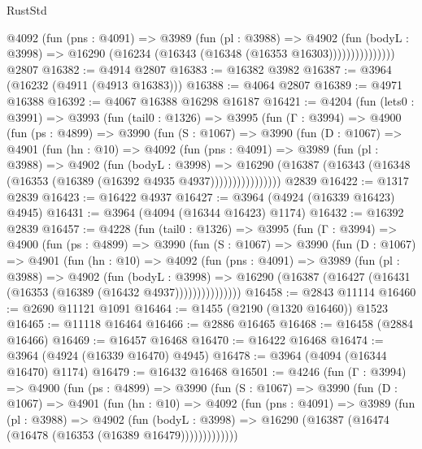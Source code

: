 \begin{lexlean}{RustStd}
\begin{coremodule}
{\begin{coremodule}
{{{{{{{{{{{{{{{{{{{{{{{{{{{{{{{{{{{{{{                  @4092
                    (fun (pns : @4091) =>
                    @3989
                      (fun (pl : @3988) =>
                      @4902
                        (fun (bodyL : @3998) =>
                        @16290 (@16234 (@16343 (@16348 (@16353 @16303)))))))))))))))
    @2807
@16382 := @4914 @2807
@16383 := @16382 @3982
@16387 := @3964 (@16232 (@4911 (@4913 @16383)))
@16388 := @4064 @2807
@16389 := @4971 @16388
@16392 := @4067 @16388 @16298 @16187
@16421 := @4204
    (fun (lets0 : @3991) =>
    @3993
      (fun (tail0 : @1326) =>
      @3995
        (fun (Γ : @3994) =>
        @4900
          (fun (ps : @4899) =>
          @3990
            (fun (S : @1067) =>
            @3990
              (fun (D : @1067) =>
              @4901
                (fun (hn : @10) =>
                @4092
                  (fun (pns : @4091) =>
                  @3989
                    (fun (pl : @3988) =>
                    @4902
                      (fun (bodyL : @3998) =>
                      @16290
                        (@16387 (@16343 (@16348 (@16353 (@16389 (@16392 @4935 @4937))))))))))))))))
    @2839
@16422 := @1317 @2839
@16423 := @16422 @4937
@16427 := @3964 (@4924 (@16339 @16423) @4945)
@16431 := @3964 (@4094 (@16344 @16423) @1174)
@16432 := @16392 @2839
@16457 := @4228
    (fun (tail0 : @1326) =>
    @3995
      (fun (Γ : @3994) =>
      @4900
        (fun (ps : @4899) =>
        @3990
          (fun (S : @1067) =>
          @3990
            (fun (D : @1067) =>
            @4901
              (fun (hn : @10) =>
              @4092
                (fun (pns : @4091) =>
                @3989
                  (fun (pl : @3988) =>
                  @4902
                    (fun (bodyL : @3998) =>
                    @16290 (@16387 (@16427 (@16431 (@16353 (@16389 (@16432 @4937)))))))))))))))
@16458 := @2843 @11114
@16460 := @2690 @11121 @1091
@16464 := @1455 (@2190 (@1320 @16460)) @1523
@16465 := @11118 @16464
@16466 := @2886 @16465
@16468 := @16458 (@2884 @16466)
@16469 := @16457 @16468
@16470 := @16422 @16468
@16474 := @3964 (@4924 (@16339 @16470) @4945)
@16478 := @3964 (@4094 (@16344 @16470) @1174)
@16479 := @16432 @16468
@16501 := @4246
    (fun (Γ : @3994) =>
    @4900
      (fun (ps : @4899) =>
      @3990
        (fun (S : @1067) =>
        @3990
          (fun (D : @1067) =>
          @4901
            (fun (hn : @10) =>
            @4092
              (fun (pns : @4091) =>
              @3989
                (fun (pl : @3988) =>
                @4902
                  (fun (bodyL : @3998) =>
                  @16290 (@16387 (@16474 (@16478 (@16353 (@16389 @16479)))))))))))))
}}}}}}}}}}}}}}}}}}}}}}}}}}}}}}}}}}}}}}
\end{coremodule}}
\end{coremodule}
\end{lexlean}

